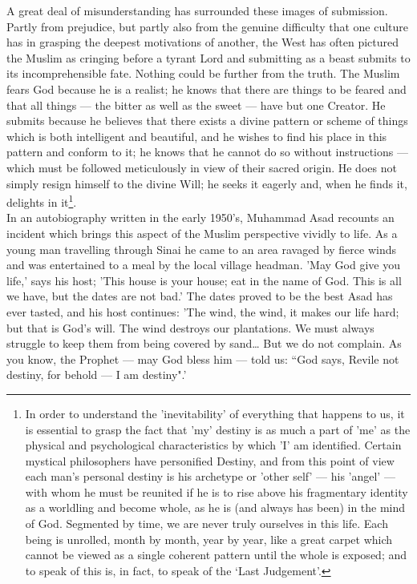 \documentclass[10pt, twoside,openright]{book}
\begin{document}
A great deal of misunderstanding has surrounded these images of submission. Partly from prejudice, 
but partly also from the genuine difficulty that one culture has in grasping the deepest motivations 
of another, the West has often pictured the Muslim as cringing before a tyrant Lord and submitting as 
a beast submits to its incomprehensible fate. Nothing could be further from the truth. The Muslim 
fears God because he is a realist; he knows that there are things to be feared and that all things --- 
the bitter as well as the sweet --- have but one Creator. He submits because he believes that there 
exists a divine pattern or scheme of things which is both intelligent and beautiful, and he wishes to 
find his place in this pattern and conform to it; he knows that he cannot do so without instructions 
--- which must be followed meticulously in view of their sacred origin. He does not simply resign 
himself to the divine Will; he seeks it eagerly and, when he finds it, delights in it\footnote{In order to understand the 'inevitability' of everything that happens to us, it is essential to grasp the fact that 'my' destiny is as much a part of 'me' as the physical and psychological characteristics by which 'I' am identified. Certain mystical philosophers have personified Destiny, and from this point of view each man's personal destiny is his archetype or 'other self' --- his 'angel' --- with whom he must be reunited if he is to rise above his fragmentary identity as a worldling and become whole, as he is (and always has been) in the mind of God. Segmented by time, we are never truly ourselves in this life. Each being is unrolled, month by month, year by year, like a great carpet which cannot be viewed as a single coherent pattern until the whole is exposed; and to speak of this is, in fact, to speak of the `Last Judgement'.}. \\


In an autobiography written in the early 1950's, Muhammad Asad recounts an incident which brings this 
aspect of the Muslim perspective vividly to life. As a young man travelling through Sinai he came to 
an area ravaged by fierce winds and was entertained to a meal by the local village headman. 'May God 
give you life,' says his host; 'This house is your house; eat in the name of God. This is all we 
have, but the dates are not bad.' The dates proved to be the best Asad has ever tasted, and his host 
continues: 'The wind, the wind, it makes our life hard; but that is God's will. The wind destroys our 
plantations. We must always struggle to keep them from being covered by sand\ldots{} But we do not 
complain. As you know, the Prophet --- may God bless him --- told us: ``God says, Revile not destiny, for 
behold --- I am destiny".' \\
\end{document}
